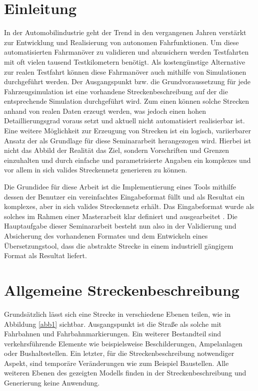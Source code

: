 \thispagestyle{ika}

\chapter{Einleitung}

In der Automobilindustrie geht der Trend in den vergangenen Jahren verstärkt  zur Entwicklung und Realisierung von autonomen Fahrfunktionen. Um diese automatisierten Fahrmanöver zu validieren und abzusichern werden Testfahrten mit oft vielen tausend Testkilometern benötigt. Als kostengünstige Alternative zur realen Testfahrt können diese Fahrmanöver auch mithilfe von Simulationen durchgeführt werden. Der Ausgangspunkt bzw. die Grundvoraussetzung für jede Fahrzeugsimulation ist eine vorhandene Streckenbeschreibung auf der die entsprechende Simulation durchgeführt wird. Zum einen können solche Strecken anhand von realen Daten erzeugt werden, was jedoch einen hohen Detaillierungsgrad voraus setzt und aktuell nicht automatisiert realisierbar ist. Eine weitere Möglichkeit zur Erzeugung von Strecken ist ein logisch, variierbarer Ansatz der als Grundlage für diese Seminararbeit herangezogen wird. Hierbei ist nicht das Abbild der Realität das Ziel, sondern Vorschriften und Grenzen einzuhalten und durch einfache und parametrisierte Angaben ein komplexes und vor allem in sich valides Streckennetz generieren zu können.

Die Grundidee für diese Arbeit ist die Implementierung eines Tools mithilfe dessen der Benutzer ein vereinfachtes Eingabeformat füllt und als Resultat ein komplexes, aber in sich valides Streckennetz erhält. Das Eingabeformat wurde als solches im Rahmen einer Masterarbeit klar definiert und ausgearbeitet \cite{Russ.2019}. Die Hauptaufgabe dieser Seminararbeit besteht nun also in der Validierung und Absicherung des vorhandenen Formates und dem Entwickeln eines Übersetzungstool, dass die abstrakte Strecke in einem industriell gängigem Format als Resultat liefert.

\chapter{Allgemeine Streckenbeschreibung}

Grundsätzlich lässt sich eine Strecke in verschiedene Ebenen teilen, wie in Abbildung \ref{abb1} sichtbar. Ausgangspunkt ist die Straße als solche mit Fahrbahnen und Fahrbahnmarkierungen. Ein weiterer Bestandteil sind verkehrsführende Elemente wie beispielsweise Beschilderungen, Ampelanlagen oder Bushaltestellen. Ein letzter, für die Streckenbeschreibung notwendiger Aspekt, sind temporäre Veränderungen wie zum Beispiel Baustellen. Alle weiteren Ebenen des gezeigten Modells finden in der Streckenbeschreibung und Generierung keine Anwendung.

